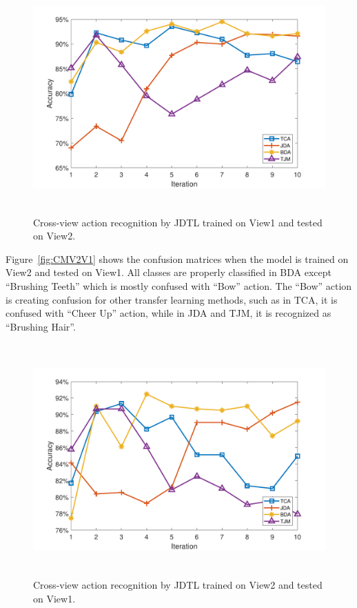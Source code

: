 \begin{figure}[hbt!]
		\centering
	\includegraphics[width=5in,height=3.5in]{figures/plots/View1-View2-2}
	\linebreak
	\caption{Cross-view action recognition by JDTL trained on View1 and tested on View2.}
	\label{fig1:View1-View2}
\end{figure}
Figure~\ref{fig:CMV2V1} shows the confusion matrices when the model is trained on View2 and tested on View1. All classes are properly classified in BDA except \enquote{Brushing Teeth} which is mostly confused with \enquote{Bow} action. The \enquote{Bow} action is creating confusion for other transfer learning methods, such as in TCA, it is confused with \enquote{Cheer Up} action, while in JDA and TJM, it is recognized as \enquote{Brushing Hair}.
\begin{figure}[]
	\centering
	\includegraphics[width=5in,height=3.5in]{figures/plots/View2-View1}
	\linebreak
	\caption{Cross-view action recognition by JDTL trained on View2 and tested on View1.}
	\label{fig1:View2-View1}
\end{figure}


